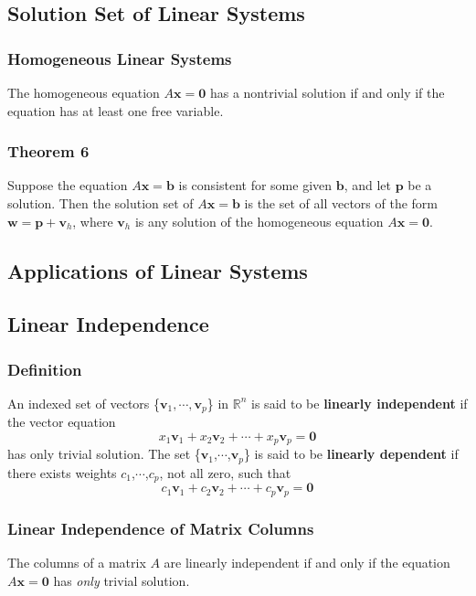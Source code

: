 \documentclass[letterpaper,11pt]{article}
\begin{document}
		\subsection{Solution Set of Linear Systems}
			\subsubsection{Homogeneous Linear Systems}
				The homogeneous equation $A\mathbf{x}=\mathbf{0}$ has a nontrivial solution if and only if the equation has at least one free variable.
			\subsubsection{Theorem 6}
				Suppose the equation $A\mathbf{x}=\mathbf{b}$ is consistent for some given $\mathbf{b}$, and let $\mathbf{p}$ be a solution. Then the solution set of $A\mathbf{x}=\mathbf{b}$ is the set of all vectors of the form $\mathbf{w}=\mathbf{p}+\mathbf{v}_h$, where $\mathbf{v}_h$ is any solution of the homogeneous equation $A\mathbf{x}=\mathbf{0}$.
		\subsection{Applications of Linear Systems}
		\subsection{Linear Independence}
			\subsubsection{Definition}
				An indexed set of vectors \{$\mathbf{v}_1,\cdots,\mathbf{v}_p$\} in $\mathbb{R}^n$ is said to be \textbf{linearly independent} if the vector equation
				\begin{equation}
					x_1\mathbf{v}_1+x_2\mathbf{v}_2+\cdots+x_p\mathbf{v}_p=\mathbf{0}
				\end{equation}
				has only trivial solution. The set \{$\mathbf{v}_1$,$\cdots$,$\mathbf{v}_p$\} is said to be \textbf{linearly dependent} if there exists weights $c_1$,$\cdots$,$c_p$, not all zero, such that
				\begin{equation}
					c_1\mathbf{v}_1+c_2\mathbf{v}_2+\cdots+c_p\mathbf{v}_p=\mathbf{0}
				\end{equation}
			\subsubsection{Linear Independence of Matrix Columns}
				The columns of a matrix $A$ are linearly independent if and only if the equation $A\mathbf{x}=\mathbf{0}$ has \textit{only} trivial solution.
\end{document}
